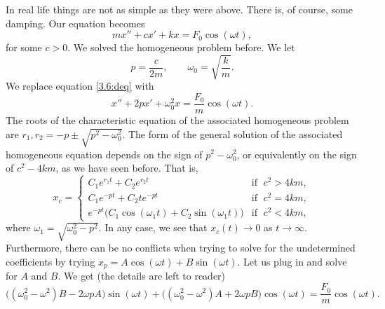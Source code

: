 In real life things are not as simple as they were above.  There is,
of course, some damping.  Our equation becomes
\begin{equation} \label{3.6:deq}
mx'' + cx' + kx = F_0 \cos (\omega t) ,
\end{equation}
for some $c > 0$.  We solved the homogeneous problem before.  We let
\begin{equation*}
p = \frac{c}{2m},  \qquad \omega_0 = \sqrt{\frac{k}{m}} .
\end{equation*}
We replace equation \eqref{3.6:deq} with
\begin{equation*}
x'' + 2px' + \omega_0^2x = \frac{F_0}{m} \cos (\omega t) .
\end{equation*}
The roots of the characteristic equation of the associated
homogeneous problem are $r_1,r_2 = -p \pm \sqrt{p^2 - \omega_0^2}$.  The form
of the general solution of the associated homogeneous equation
depends on the sign of $p^2 - \omega_0^2$, or
equivalently on the sign of $c^2 - 4km$, as we have
seen before.  That is,
\begin{equation*}
x_c =
\begin{cases}
C_1 e^{r_1 t} + C_2 e^{r_2 t} & \text{if } \; c^2 > 4km , \\
C_1 e^{-p t} + C_2 t e^{-p t} & \text{if } \; c^2 = 4km , \\
e^{-p t} \bigl( C_1 \cos (\omega_1 t) + C_2 \sin (\omega_1 t) \bigr) &
  \text{if } \; c^2 < 4km ,
\end{cases}
\end{equation*}
where $\omega_1 = \sqrt{\omega_0^2 - p^2}$.  In any case, we see that
$x_c(t) \to 0$ as $t \to \infty$.  Furthermore,
there can be no conflicts when trying to solve for the
undetermined coefficients by trying $x_p = A \cos (\omega t)
+ B \sin (\omega t)$.
Let us plug
in and solve for $A$ and $B$.
We get (the  %
details are left to reader)
\begin{equation*}
\bigl((\omega_0^2  - \omega^2)B - 2\omega p A\bigr) \sin (\omega t)
+
\bigl((\omega_0^2  - \omega^2)A + 2\omega p B\bigr) \cos (\omega t)
=
\frac{F_0}{m} \cos (\omega t) .
\end{equation*}

